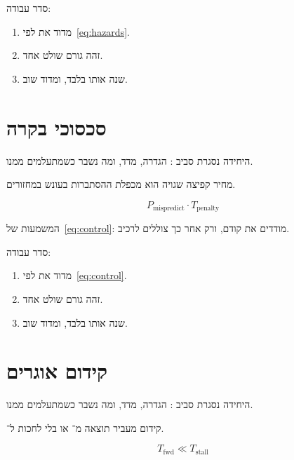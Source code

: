 סדר עבודה:
\begin{enumerate}
\item[(\textbf{א})] מדוד את  לפי~\eqref{eq:hazards}.
\item[(\textbf{ב})] זהה גורם שולט אחד.
\item[(\textbf{ג})] שנה אותו בלבד, ומדוד שוב.
\end{enumerate}

\chapter{סכסוכי בקרה}
\label{ch:control}

היחידה נסגרת סביב : הגדרה, מדד, ומה נשבר כשמתעלמים ממנו.

\begin{keybox}[frametitle={רעיון מפתח — סכסוכי בקרה}]
מחיר קפיצה שגויה הוא מכפלת ההסתברות בעונש במחזורים.
\end{keybox}

\begin{equation}
\label{eq:control}
P_{\mathrm{mispredict}}\cdot T_{\mathrm{penalty}}
\end{equation}

המשמעות של~\eqref{eq:control}: מודדים את  קודם, ורק אחר כך צוללים לרכיב.

סדר עבודה:
\begin{enumerate}
\item[(\textbf{א})] מדוד את  לפי~\eqref{eq:control}.
\item[(\textbf{ב})] זהה גורם שולט אחד.
\item[(\textbf{ג})] שנה אותו בלבד, ומדוד שוב.
\end{enumerate}

\chapter{קידום אוגרים}
\label{ch:forward}

היחידה נסגרת סביב : הגדרה, מדד, ומה נשבר כשמתעלמים ממנו.

\begin{defbox}[frametitle={הגדרה — קידום אוגרים}]
קידום מעביר תוצאה מ־ או  בלי לחכות ל־.
\end{defbox}

\begin{equation}
\label{eq:forward}
T_{\mathrm{fwd}} \ll T_{\mathrm{stall}}
\end{equation}

